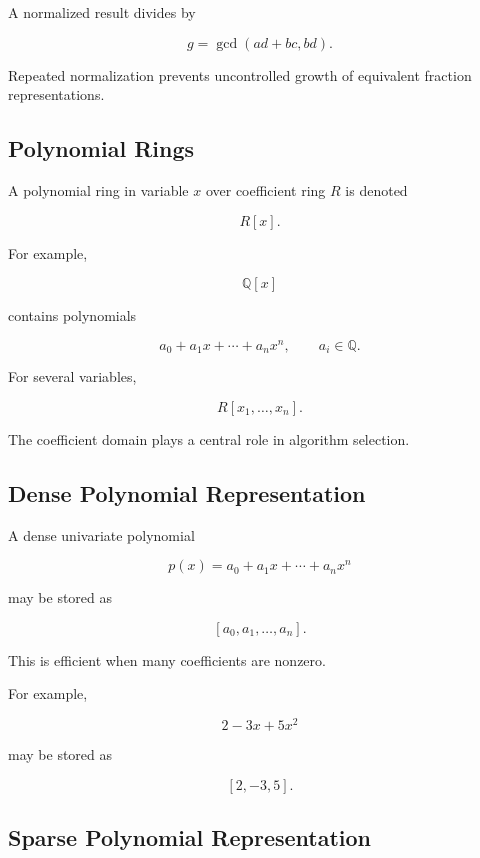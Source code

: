A normalized result divides by

\[
\boxed{
g
=
\gcd(ad+bc,bd).
}
\]

Repeated normalization prevents uncontrolled growth of equivalent
fraction representations.

\subsection{Polynomial Rings}
\label{subsec:computer-algebra-polynomial-rings}

A polynomial ring in variable \(x\) over coefficient ring \(R\) is denoted

\[
\boxed{
R[x].
}
\]

For example,

\[
\mathbb{Q}[x]
\]

contains polynomials

\[
\boxed{
a_0+a_1x+\cdots+a_nx^n,
\qquad
a_i\in\mathbb{Q}.
}
\]

For several variables,

\[
\boxed{
R[x_1,\ldots,x_n].
}
\]

The coefficient domain plays a central role in algorithm selection.

\subsection{Dense Polynomial Representation}
\label{subsec:dense-polynomial-representation}

A dense univariate polynomial

\[
p(x)
=
a_0+a_1x+\cdots+a_nx^n
\]

may be stored as

\[
\boxed{
[a_0,a_1,\ldots,a_n].
}
\]

This is efficient when many coefficients are nonzero.

For example,

\[
2-3x+5x^2
\]

may be stored as

\[
\boxed{
[2,-3,5].
}
\]

\subsection{Sparse Polynomial Representation}
\label{subsec:sparse-polynomial-representation}

